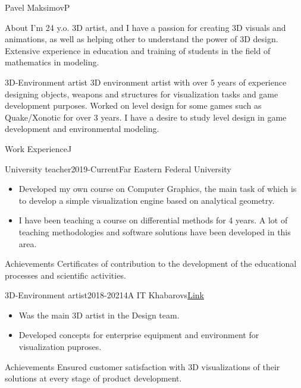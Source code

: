\documentclass[10pt]{extarticle}
\begin{document}
	\begin{centralpart}{Pavel Maksimov}{P}{}
		\begin{titleblock}{About}{}{}{}
			I'm 24 y.o. 3D artist, and I have a passion for creating 3D visuals and animations, as well as helping other to understand the power of 3D design. Extensive experience in education and training of students in the field of mathematics in modeling.
		\end{titleblock}

		\begin{titleblock}{3D-Environment artist}{}{}{}
			3D environment artist with over 5 years of experience designing objects, weapons and structures for visualization tasks and game development purposes. Worked on level design for some games such as Quake/Xonotic for over 3 years. I have a desire to study level design in game development and environmental modeling.
		\end{titleblock}
	\end{centralpart}

	\setlength{\currentpos}{\getposy+5pt}
	
	\begin{centralpart}{Work Experience}{J}{}
		\begin{titleblock}{University teacher}{2019-Current}{Far Eastern Federal University}{}
			\begin{itemize}[label=$\circ$]
				\item Developed my own course on Computer Graphics, the main task of which is to develop a simple visualization engine based on analytical geometry.
				\item I have been teaching a course on differential methods for 4 years. A lot of teaching methodologies and software solutions have been developed in this area.
			\end{itemize}
		\end{titleblock}
		\begin{additionalblock}{Achievements}
			Certificates of contribution to the development of the educational processes and scientific activities.
		\end{additionalblock}
		\begin{titleblock}{3D-Environment artist}{2018-2021}{4A IT Khabarovs}{\href{https://4ait.ru/}{Link}}
			\begin{itemize}[label=$\circ$]
				\item Was the main 3D artist in the Design team.
				\item Developed concepts for enterprise equipment and environment for visualization puproses.
			\end{itemize}
		\end{titleblock}
		\begin{additionalblock}{Achievements}
			Ensured customer satisfaction with 3D visualizations of their solutions at every stage of product development.
		\end{additionalblock}
	\end{centralpart}
\end{document}

